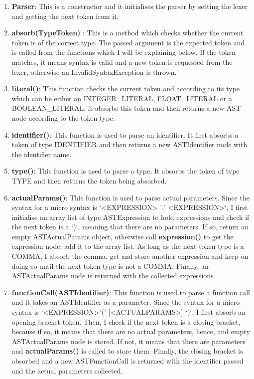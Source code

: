 \documentclass{article}
\begin{document}
				\begin{enumerate}
				\item \textbf{Parser}: This is a constructor and it initialises the parser by setting the lexer and getting the next token from it.
				\item \textbf{absorb(TypeToken)} : This is a method which checks whether the current token is of the correct type. The passed argument is the expected token and is called from the functions which I will be explaining below. If the token matches, it means syntax is valid and a new token is requested from the lexer, otherwise an InvalidSyntaxException is thrown.
				\item \textbf{literal()}: This function checks the current token and according to its type which can be either an INTEGER\_LITERAL, FLOAT\_LITERAL or a BOOLEAN\_LITERAL, it absorbs this token and then returns a new AST node according to the token type. 
				\item \textbf{identifier()}: This function is used to parse an identifier. It first absorbs a token of type IDENTIFIER and then returns a new ASTIdentifier node with the identifier name.
				\item \textbf{type()}: This function is used to parse a type. It absorbs the token of type TYPE and then returns the token being absorbed.
				
					\item \textbf{actualParams()}: This function is used to parse actual parameters. Since the syntax for a micro syntax is `\textless EXPRESSION\textgreater { ',' \textless EXPRESSION\textgreater }`, I first initialise an array list of type ASTExpression to hold expressions and check if the next token is a `)`, meaning that there are no parameters. If so, return an empty ASTActualParams object, otherwise call \textbf{expression()} to get the expression node, add it to the array list. As long as the next token type is a COMMA, I absorb the comma, get and store another expression and keep on doing so until the next token type is not a COMMA. Finally, an ASTActualParams node is returned with the collected expressions.
					
					
				\item \textbf{functionCall(ASTIdentifier)}: This function is used to parse a function call and it takes an ASTIdentifier as a parameter. Since the syntax for a micro syntax is `\textless EXPRESSION\textgreater '(' [\textless ACTUALPARAMS\textgreater] `)`, I first absorb an opening bracket token. Then, I check if the next token is a closing bracket, because if so, it means that there are no actual parameters, hence, and empty ASTActualParams node is stored. If not, it means that there are parameters and \textbf{actualParams()} is called to store them. Finally, the closing bracket is absorbed and a new ASTFunctionCall is returned with the identifier passed and the actual parameters collected.
				

\end{enumerate}
\end{document}
